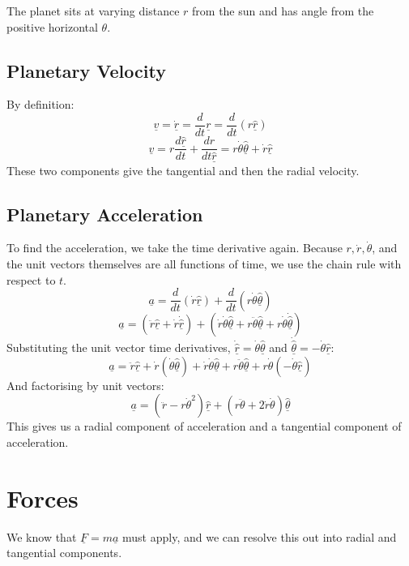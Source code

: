 The planet sits at varying distance $r$ from the sun and has angle from the positive horizontal $\theta$.

\subsection{Planetary Velocity}
By definition:
\[
    \underline{v} = \dot{\underline{r}} = \frac{d}{dt} \underline{r}= \frac{d}{dt} \left(r \hat{\underline{r}}\right)
\]
\[
    \underline{v} = r \frac{d \hat{\underline{r}}}{dt} + \frac{dr}{dt \hat{\underline{r}}} = r \dot{\theta} \hat{\underline{\theta}} + \dot{r} \hat{\underline{r}}
\]
These two components give the tangential and then the radial velocity.

\subsection{Planetary Acceleration}
To find the acceleration, we take the time derivative again. Because $r, \dot{r}, \dot{\theta}$, and the unit vectors themselves are all functions of time, we use the chain rule with respect to $t$.
\[
    \underline{a} = \frac{d}{dt} (\dot{r} \hat{\underline{r}}) + \frac{d}{dt} (r \dot{\theta} \hat{\underline{\theta}})
\]
\[
    \underline{a} = (\ddot{r} \hat{\underline{r}} + \dot{r} \dot{\hat{\underline{r}}}) + (\dot{r} \dot{\theta} \hat{\underline{\theta}} + r \ddot{\theta} \hat{\underline{\theta}} + r \dot{\theta} \dot{\hat{\underline{\theta}}})
\]
Substituting the unit vector time derivatives, $\dot{\hat{\underline{r}}} = \dot{\theta} \hat{\underline{\theta}}$ and $\dot{\hat{\underline{\theta}}} = -\dot{\theta} \hat{\underline{r}}$:
\[
    \underline{a} = \ddot{r} \hat{\underline{r}} + \dot{r} (\dot{\theta} \hat{\underline{\theta}}) + \dot{r} \dot{\theta} \hat{\underline{\theta}} + r \ddot{\theta} \hat{\underline{\theta}} + r \dot{\theta} (-\dot{\theta} \hat{\underline{r}})
\]
And factorising by unit vectors:
\[
    \underline{a} = (\ddot{r} - r \dot{\theta}^2) \hat{\underline{r}} + (r \ddot{\theta} + 2 \dot{r} \dot{\theta}) \hat{\underline{\theta}}
\]
This gives us a radial component of acceleration and a tangential component of acceleration.

\section{Forces}
We know that $\underline{F} = m \underline{a}$ must apply, and we can resolve this out into radial and tangential components.

